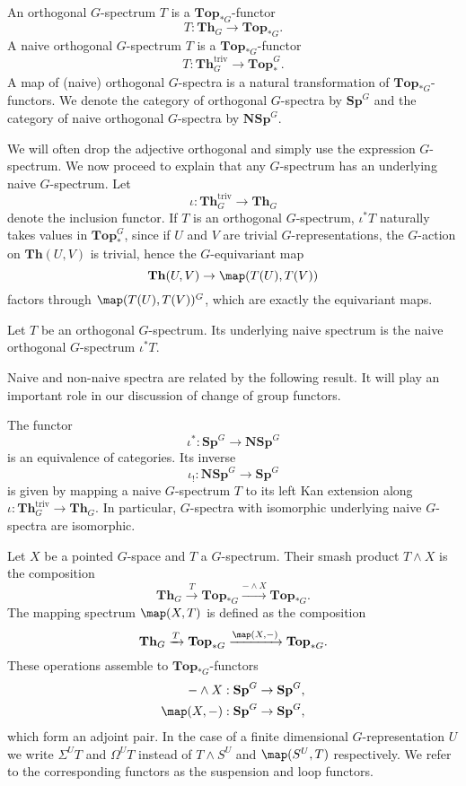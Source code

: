 \begin{mydef}
An orthogonal $G$-spectrum $T$ is a $\mathbf{Top}_{\ast G}$-functor
\[
T:\mathbf{Th}_G\to \mathbf{Top}_{\ast G}.
\]
A naive orthogonal $G$-spectrum $T$ is a $\mathbf{Top}_{\ast G}$-functor
\[
T:\mathbf{Th}^{\mathrm{triv}}_G\to \mathbf{Top}^G_{\ast}.
\]
A map of (naive) orthogonal $G$-spectra is a natural transformation of
$\mathbf{Top}_{\ast G}$-functors. We denote the category of orthogonal
$G$-spectra by $\mathbf{Sp}^G$ and the category of
naive orthogonal $G$-spectra by $\mathbf{NSp}^G$.
\end{mydef}
We will often drop the adjective orthogonal and simply use the expression
$G$-spectrum. We now proceed to explain that any $G$-spectrum has an 
underlying naive $G$-spectrum. Let
\[
\iota: \mathbf{Th}^{\mathrm{triv}}_G\to \mathbf{Th}_G
\]
denote the inclusion functor. If $T$ is an orthogonal $G$-spectrum,
$\iota^\ast T$ naturally takes values in $\mathbf{Top}^G_{\ast}$,
since if $U$ and $V$ are trivial $G$-representations, the $G$-action
on $\mathbf{Th}(U,V)$ is trivial, hence the $G$-equivariant map
\[
\mathbf{Th}(U,V)\to \map(T(U),T(V))
\]
factors through $\map(T(U),T(V))^G$, which are exactly the equivariant maps.
\begin{mydef}
Let $T$ be an orthogonal $G$-spectrum. Its underlying naive spectrum
is the naive orthogonal $G$-spectrum $\iota^\ast T$.
\end{mydef}
Naive and non-naive spectra are related by the following result. It will play an important
role in our discussion of change of group functors.
\begin{thm}\label{thm:naiveisnotnaive}
The functor
\[
\iota^\ast: \mathbf{Sp}^G\to \mathbf{NSp}^G
\]
is an equivalence of categories. 
Its inverse
\[
\iota_!: \mathbf{NSp}^G\to \mathbf{Sp}^G
\]
is given by mapping a naive $G$-spectrum $T$
to its left Kan extension along $\iota:\mathbf{Th}^{\mathrm{triv}}_G\to 
\mathbf{Th}_G$.
In particular, $G$-spectra
with isomorphic underlying naive $G$-spectra are isomorphic.
\end{thm}

\begin{mydef}
Let $X$ be a pointed $G$-space and $T$ a $G$-spectrum. Their
smash product $T\wedge X$ is the composition
\[
\mathbf{Th}_G\xrightarrow{T}\mathbf{Top}_{\ast G}
\xrightarrow{-\wedge X} \mathbf{Top}_{\ast G}.
\]
The mapping spectrum $\map(X,T)$ is defined as the composition
\[
\mathbf{Th}_G\xrightarrow{T}\mathbf{Top}_{\ast G}
\xrightarrow{\map(X,-)} \mathbf{Top}_{\ast G}.
\]
These operations assemble to $\mathbf{Top}_{\ast G}$-functors
\begin{align*}
-\wedge X: \mathbf{Sp}^G&\to \mathbf{Sp}^G,\\
\map(X,-):\mathbf{Sp}^G &\to \mathbf{Sp}^G,
\end{align*}
which form an adjoint pair.
In the case of a finite dimensional $G$-representation $U$
we write $\Sigma^U T$ and $\Omega^U T$ instead
of $T\wedge S^U$ and $\map(S^U,T)$ respectively. We refer to the corresponding functors
as the suspension and loop functors.
\end{mydef}

